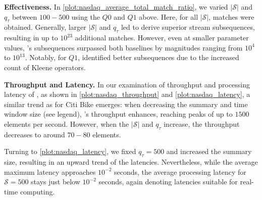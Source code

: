 \textbf{Effectiveness.} In \autoref{plot:nasdaq_average_total_match_ratio}, we
varied $|\mathcal{S}|$ and $q_\tau$ between $100 - 500$ using the $Q0$ and $Q1$ above.
Here, for all $|\mathcal{S}|$, matches were obtained. Generally, larger
$|\mathcal{S}|$ and $q_\tau$ led \suse{} to derive superior stream subsequences,
resulting in up to $10^{23}$ additional matches. However, even at smaller
parameter values, \suse{}'s subsequences surpassed both baselines by magnitudes
ranging from $10^4$ to $10^{13}$. Notably, for $Q1$, \suse{} identified better
subsequences due to the increased count of Kleene operators.

\textbf{Throughput and Latency.} In our examination of throughput and processing latency of \suse{}, as shown in \autoref{plot:nasdaq_throughput} and \autoref{plot:nasdaq_latency}, a similar trend as for Citi Bike emerges: when decreasing the summary and time window size (see legend), \suse{}'s throughput enhances, reaching peaks of up to $1500$ elements per second. However, when the $|\mathcal{S}|$ and $q_\tau$ increase, the throughput decreases to around $70-80$ elements. 

Turning to \autoref{plot:nasdaq_latency}, we fixed $q_\tau = 500$ and increased the summary size, resulting in an upward trend of the latencies. Nevertheless, while the average maximum latency approaches $10^{-2}$ seconds, the average processing latency for $\mathcal{S} = 500$ stays just below $10^{-2}$ seconds, again denoting latencies suitable for real-time computing.




